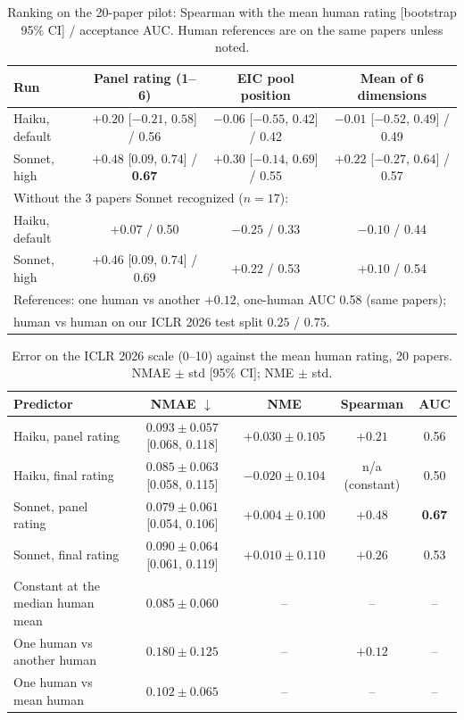 \documentclass[11pt,a4paper]{article}
\begin{document}
\begin{table}[t]
\centering\small
\caption{Ranking on the 20-paper pilot: Spearman with the mean human rating [bootstrap 95\% CI] /
acceptance AUC. Human references are on the same papers unless noted.}
\label{tab:rank}
\setlength{\tabcolsep}{3pt}\footnotesize
\begin{tabular}{lccc}
\toprule
Run & Panel rating (1--6) & EIC pool position & Mean of 6 dimensions\\
\midrule
Haiku, default & $+0.20$ [$-0.21$, $0.58$] / 0.56 & $-0.06$ [$-0.55$, $0.42$] / 0.42 & $-0.01$ [$-0.52$, $0.49$] / 0.49\\
Sonnet, high   & $\mathbf{+0.48}$ [$0.09$, $0.74$] / \textbf{0.67} & $+0.30$ [$-0.14$, $0.69$] / 0.55 & $+0.22$ [$-0.27$, $0.64$] / 0.57\\
\midrule
\multicolumn{4}{l}{Without the 3 papers Sonnet recognized ($n=17$):}\\
Haiku, default & $+0.07$ / 0.50 & $-0.25$ / 0.33 & $-0.10$ / 0.44\\
Sonnet, high   & $+0.46$ [$0.09$, $0.74$] / 0.69 & $+0.22$ / 0.53 & $+0.10$ / 0.54\\
\midrule
\multicolumn{4}{l}{References: one human vs another $+0.12$, one-human AUC 0.58 (same papers);}\\
\multicolumn{4}{l}{human vs human on our ICLR 2026 test split $0.25$ / $0.75$.}\\
\bottomrule
\end{tabular}
\end{table}

\begin{table}[t]
\centering\small
\caption{Error on the ICLR 2026 scale (0--10) against the mean human rating, 20 papers.
NMAE $\pm$ std [95\% CI]; NME $\pm$ std.}
\label{tab:err}
\setlength{\tabcolsep}{3pt}\footnotesize
\begin{tabular}{lcccc}
\toprule
Predictor & NMAE $\downarrow$ & NME & Spearman & AUC\\
\midrule
Haiku, panel rating  & $0.093\pm0.057$ [0.068, 0.118] & $+0.030\pm0.105$ & $+0.21$ & 0.56\\
Haiku, final rating  & $0.085\pm0.063$ [0.058, 0.115] & $-0.020\pm0.104$ & n/a (constant) & 0.50\\
Sonnet, panel rating & $\mathbf{0.079}\pm0.061$ [0.054, 0.106] & $\mathbf{+0.004}\pm0.100$ & $\mathbf{+0.48}$ & \textbf{0.67}\\
Sonnet, final rating & $0.090\pm0.064$ [0.061, 0.119] & $+0.010\pm0.110$ & $+0.26$ & 0.53\\
\midrule
Constant at the median human mean & $0.085\pm0.060$ & -- & -- & --\\
One human vs another human        & $0.180\pm0.125$ & -- & $+0.12$ & --\\
One human vs mean human           & $0.102\pm0.065$ & -- & -- & --\\
\bottomrule
\end{tabular}
\end{table}
\end{document}

